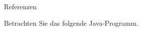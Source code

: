 \begin{frame}[t]%
\medskip

\begin{exercise}{Referenzen}
\begin{body}
Betrachten Sie das folgende Java-Programm.
  
\end{body}
\end{exercise}

\end{frame}
